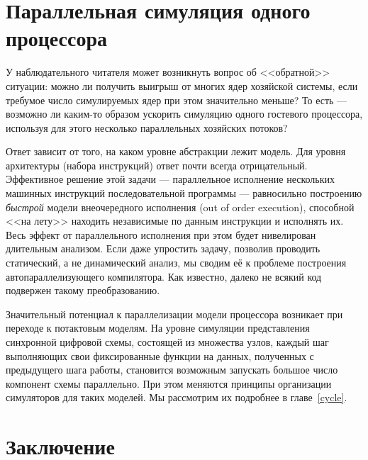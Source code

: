 % 
% 


\section{Параллельная симуляция одного процессора}

У наблюдательного читателя может возникнуть вопрос об <<обратной>> ситуации: можно ли получить выигрыш от многих ядер хозяйской системы, если требумое число симулируемых ядер при этом значительно меньше?  То есть — возможно ли каким-то образом ускорить симуляцию одного гостевого процессора, используя для этого несколько параллельных хозяйских потоков? 

Ответ зависит от того, на каком уровне абстракции лежит модель. Для уровня архитектуры (набора инструкций) ответ почти всегда отрицательный. Эффективное решение этой задачи — параллельное исполнение нескольких машинных инструкций последовательной программы — равносильно построению \textit{быстрой} модели внеочередного исполнения (\abbr out of order execution), способной <<на лету>> находить независимые по данным инструкции и исполнять их. Весь эффект от параллельного исполнения при этом будет нивелирован длительным анализом. Если даже упростить задачу, позволив проводить статический, а не динамический анализ, мы сводим её к проблеме построения автопараллелизующего компилятора. Как известно, далеко не всякий код подвержен такому преобразованию.

Значительный потенциал к параллелизации модели процессора возникает при переходе к потактовым моделям. На уровне симуляции представления синхронной цифровой схемы, состоящей из множества узлов, каждый шаг выполняющих свои фиксированные функции на данных, полученных с предыдущего шага работы, становится возможным запускать большое число компонент схемы параллельно. При этом меняются принципы организации симуляторов для таких моделей. Мы рассмотрим их подробнее в главе~\ref{cycle}.

\section{Заключение}

